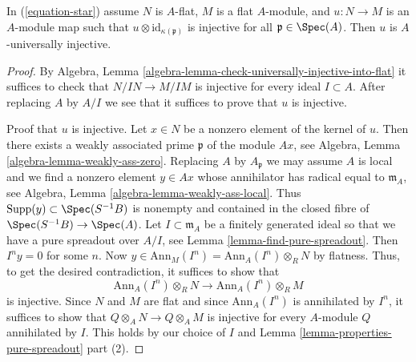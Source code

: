 \begin{lemma}
\label{lemma-universally-injective-if-flat}
In (\ref{equation-star}) assume $N$ is $A$-flat, $M$ is a flat $A$-module,
and $u : N \to M$ is an $A$-module map such that
$u \otimes \text{id}_{\kappa(\mathfrak p)}$ is injective for all
$\mathfrak p \in \Spec(A)$. Then $u$ is $A$-universally injective.
\end{lemma}

\begin{proof}
By Algebra, Lemma \ref{algebra-lemma-check-universally-injective-into-flat}
it suffices to check that $N/IN \to M/IM$ is injective for every
ideal $I \subset A$. After replacing $A$ by $A/I$ we see that it suffices
to prove that $u$ is injective.

\medskip\noindent
Proof that $u$ is injective. Let $x \in N$ be a nonzero element of the
kernel of $u$. Then there exists a weakly associated prime $\mathfrak p$
of the module $Ax$, see Algebra, Lemma \ref{algebra-lemma-weakly-ass-zero}.
Replacing $A$ by $A_\mathfrak p$ we may assume $A$ is local and
we find a nonzero element $y \in Ax$ whose annihilator has radical
equal to $\mathfrak m_A$, see
Algebra, Lemma \ref{algebra-lemma-weakly-ass-local}.
Thus $\text{Supp}(y) \subset \Spec(S^{-1}B)$ is nonempty and
contained in the closed fibre of $\Spec(S^{-1}B) \to \Spec(A)$.
Let $I \subset \mathfrak m_A$ be a
finitely generated ideal so that we have a pure spreadout over $A/I$, see
Lemma \ref{lemma-find-pure-spreadout}. Then $I^n y = 0$ for some $n$. Now
$y \in \text{Ann}_M(I^n) = \text{Ann}_A(I^n) \otimes_R N$ by flatness.
Thus, to get the desired contradiction, it suffices to show that
$$
\text{Ann}_A(I^n) \otimes_R N
\longrightarrow
\text{Ann}_A(I^n) \otimes_R M
$$
is injective. Since $N$ and $M$ are flat and since $\text{Ann}_A(I^n)$
is annihilated by $I^n$, it suffices to show that
$Q \otimes_A N \to Q \otimes_A M$ is injective for every $A$-module
$Q$ annihilated by $I$. This holds by our choice of $I$ and
Lemma \ref{lemma-properties-pure-spreadout} part (2).
\end{proof}
